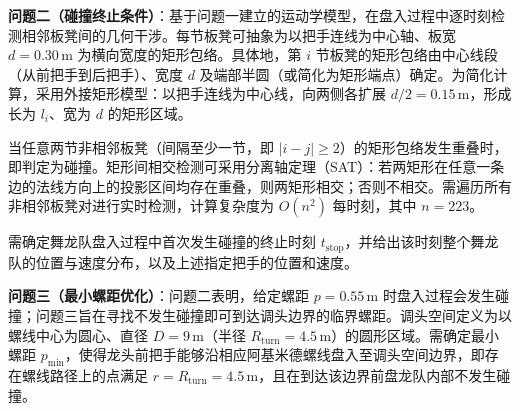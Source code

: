 \documentclass{mcmthesis}
\begin{document}
\textbf{问题二（碰撞终止条件）}：基于问题一建立的运动学模型，在盘入过程中逐时刻检测相邻板凳间的几何干涉。每节板凳可抽象为以把手连线为中心轴、板宽 $d=0.30\,\text{m}$ 为横向宽度的矩形包络。具体地，第 $i$ 节板凳的矩形包络由中心线段（从前把手到后把手）、宽度 $d$ 及端部半圆（或简化为矩形端点）确定。为简化计算，采用外接矩形模型：以把手连线为中心线，向两侧各扩展 $d/2 = 0.15\,\text{m}$，形成长为 $l_i$、宽为 $d$ 的矩形区域。

当任意两节非相邻板凳（间隔至少一节，即 $|i-j| \geq 2$）的矩形包络发生重叠时，即判定为碰撞。矩形间相交检测可采用分离轴定理（SAT）：若两矩形在任意一条边的法线方向上的投影区间均存在重叠，则两矩形相交；否则不相交。需遍历所有非相邻板凳对进行实时检测，计算复杂度为 $O(n^2)$ 每时刻，其中 $n=223$。

需确定舞龙队盘入过程中首次发生碰撞的终止时刻 $t_{\text{stop}}$，并给出该时刻整个舞龙队的位置与速度分布，以及上述指定把手的位置和速度。

\textbf{问题三（最小螺距优化）}：问题二表明，给定螺距 $p=0.55\,\text{m}$ 时盘入过程会发生碰撞；问题三旨在寻找不发生碰撞即可到达调头边界的临界螺距。调头空间定义为以螺线中心为圆心、直径 $D = 9\,\text{m}$（半径 $R_{\text{turn}} = 4.5\,\text{m}$）的圆形区域。需确定最小螺距 $p_{\min}$，使得龙头前把手能够沿相应阿基米德螺线盘入至调头空间边界，即存在螺线路径上的点满足 $r = R_{\text{turn}} = 4.5\,\text{m}$，且在到达该边界前盘龙队内部不发生碰撞。
\end{document}
